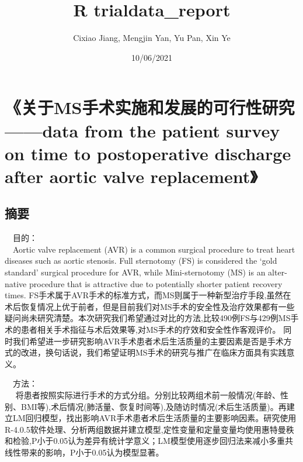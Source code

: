 \documentclass[
]{article}
\title{R trialdata\_report}
\author{Cixiao Jiang, Mengjin Yan, Yu Pan, Xin Ye}
\date{10/06/2021}
\newenvironment{Shaded}{\begin{snugshade}}{\end{snugshade}}
\newcommand{\AttributeTok}[1]{\textcolor[rgb]{0.77,0.63,0.00}{#1}}
\newcommand{\ConstantTok}[1]{\textcolor[rgb]{0.00,0.00,0.00}{#1}}
\newcommand{\FunctionTok}[1]{\textcolor[rgb]{0.00,0.00,0.00}{#1}}
\newcommand{\NormalTok}[1]{#1}
\newcommand{\SpecialCharTok}[1]{\textcolor[rgb]{0.00,0.00,0.00}{#1}}
\begin{document}
\maketitle

\begin{Shaded}
\end{Shaded}

\hypertarget{ux5173ux4e8emsux624bux672fux5b9eux65bdux548cux53d1ux5c55ux7684ux53efux884cux6027ux7814ux7a76data-from-the-patient-survey-on-time-to-postoperative-discharge-after-aortic-valve-replacement}{%
\section{《关于MS手术实施和发展的可行性研究------data from the patient
survey on time to postoperative discharge after aortic valve
replacement》}\label{ux5173ux4e8emsux624bux672fux5b9eux65bdux548cux53d1ux5c55ux7684ux53efux884cux6027ux7814ux7a76data-from-the-patient-survey-on-time-to-postoperative-discharge-after-aortic-valve-replacement}}

\hypertarget{ux6458ux8981}{%
\subsection{摘要}\label{ux6458ux8981}}

 目的：\\
 Aortic valve replacement (AVR) is a common surgical procedure to treat
heart diseases such as aortic stenosis. Full sternotomy (FS) is
considered the `gold standard' surgical procedure for AVR, while
Mini-sternotomy (MS) is an alter- native procedure that is attractive
due to potentially shorter patient recovery times.
FS手术属于AVR手术的标准方式，而MS则属于一种新型治疗手段,虽然在术后恢复情况上优于前者，但是目前我们对MS手术的安全性及治疗效果都有一些疑问尚未研究清楚。本次研究我们希望通过对比的方法,比较490例FS与429例MS手术的患者相关手术指征与术后效果等,对MS手术的疗效和安全性作客观评价。
同时我们希望进一步研究影响AVR手术患者术后生活质量的主要因素是否是手术方式的改进，换句话说，我们希望证明MS手术的研究与推广在临床方面具有实践意义。

 方法：\\
 
将患者按照实际进行手术的方式分组。分别比较两组术前一般情况(年龄、性别、BMI等),术后情况(肺活量、恢复时间等),及随访时情况(术后生活质量)。再建立LM回归模型，找出影响AVR手术患者术后生活质量的主要影响因素。研究使用R-4.0.5软件处理、分析两组数据并建立模型,定性变量和定量变量均使用惠特曼秩和检验,P小于0.05认为差异有统计学意义；LM模型使用逐步回归法来减小多重共线性带来的影响，P小于0.05认为模型显著。
\end{document}
